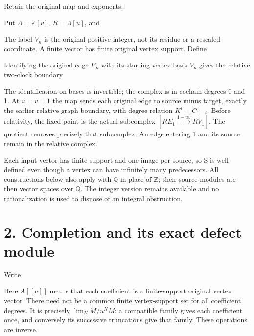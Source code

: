 Retain the original map and exponents:


Put \(\Lambda=\mathbb Z[v]\), \(R=\Lambda[u]\), and


The label \(V_n\) is the original positive integer, not its residue or a
rescaled coordinate. A finite vector has finite original vertex support.
Define


Identifying the original edge \(E_n\) with its starting-vertex basis
\(V_n\) gives the relative two-clock boundary


The identification on bases is invertible; the complex is in cochain
degrees 0 and 1. At \(u=v=1\) the map sends each original edge to source
minus target, exactly the earlier relative graph boundary, with degree
relation \(K^i=C_{1-i}\). Before relativity, the fixed point is the
actual subcomplex \([RE_1\xrightarrow{1-uv}RV_1]\). The quotient removes
precisely that subcomplex. An edge entering 1 and its source remain in
the relative complex.

Each input vector has finite support and one image per source, so S is
well-defined even though a vertex can have infinitely many predecessors.
All constructions below also apply with \(\mathbb Q\) in place of
\(\mathbb Z\); their source modules are then vector spaces over
\(\mathbb Q\). The integer version remains available and no
rationalization is used to dispose of an integral obstruction.

\section{2. Completion and its exact defect module}

Write


Here \(A[[u]]\) means that each coefficient is a finite-support original
vertex vector. There need not be a common finite vertex-support set for
all coefficient degrees. It is precisely \(\lim_N M/u^N M\): a
compatible family gives each coefficient once, and conversely its
successive truncations give that family. These operations are inverse.

